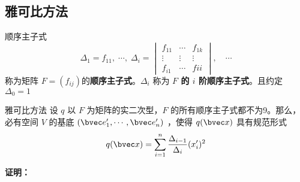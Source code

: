 \subsection{雅可比方法}
\begin{definition}{顺序主子式}
\begin{equation}
\Delta_1=f_{11},\;\cdots,\;\Delta_i=\begin{vmatrix}
f_{11}&\cdots&f_{1k}\\
\vdots&\vdots&\vdots\\
f_{i1}&\cdots&f{ii}
\end{vmatrix},\quad
\cdots
\end{equation}
称为矩阵 $F=(f_{ij})$的\textbf{顺序主子式}。$\Delta_i$ 称为\textbf{ $F$ 的 $i$ 阶顺序主子式}。且约定 $\Delta_0=1$
\end{definition}
\begin{theorem}{雅可比方法}
设 $q$ 以 $F$ 为矩阵的实二次型，$F$ 的所有顺序主子式都不为9。那么，必有空间 $V$ 的基底 $(\bvec e'_1,\cdots,\bvec e'_n)$ ，使得 $q(\bvec x)$ 具有规范形式
\begin{equation}\label{DeQua_eq4}
q(\bvec x)=\sum_{i=1}^n\frac{\Delta_{i-1}}{\Delta_i}(x'_i)^2
\end{equation}
\end{theorem}
\textbf{证明：}
